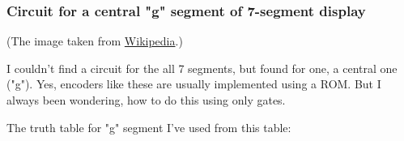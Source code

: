 \subsubsection{Circuit for a central "g" segment of 7-segment display}

\begin{figure}[H]
\centering
{}
\end{figure}

(The image taken from \href{https://commons.wikimedia.org/wiki/File:7-segment_labeled.svg}{Wikipedia}.)

I couldn't find a circuit for the all 7 segments, but found for one, a central one ("g").
Yes, encoders like these are usually implemented using a ROM.
But I always been wondering, how to do this using only gates.

The truth table for "g" segment I've used from this table:

\begin{figure}[H]
\centering
{}
\end{figure}

